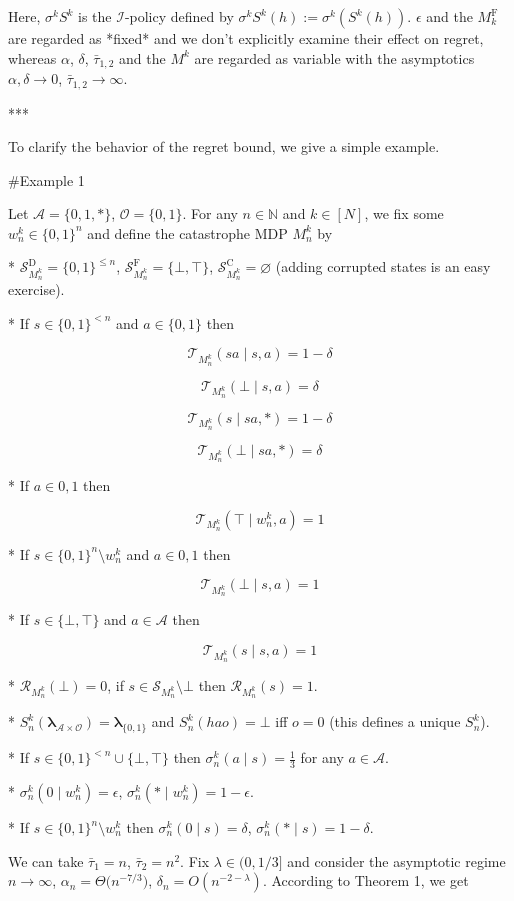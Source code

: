 \documentclass[a4paper]{article}
\newcommand{\Bool}{\{0,1\}}
\newcommand{\AP}[1]{\left(#1\right)}
\newcommand{\Nats}{\mathbb{N}}
\newcommand{\Estr}{\boldsymbol{\lambda}}
\newcommand{\Ob}{\mathcal{O}}
\newcommand{\A}{\mathcal{A}}
\newcommand{\St}{\mathcal{S}}
\newcommand{\T}{\mathcal{T}}
\newcommand{\R}{\mathcal{R}}
\newcommand{\In}{\mathcal{I}}
\newcommand{\RMC}{\mathrm{C}}
\newcommand{\RMD}{\mathrm{D}}
\newcommand{\RMF}{\mathrm{F}}
\newcommand{\SF}{\St^{\RMF}}
\newcommand{\SD}{\St^{\RMD}}
\newcommand{\SC}{\St^{\RMC}}
\newcommand{\MF}{M^{\RMF}}
\begin{document}
Here, $\sigma^k S^k$ is the $\In$-policy defined by $\sigma^k S^k(h):=\sigma^k\AP{S^k(h)}$. $\epsilon$ and the $\MF_k$ are regarded as *fixed* and we don't explicitly examine their effect on regret, whereas $\alpha$, $\delta$, $\bar{\tau}_{1,2}$ and the $M^k$ are regarded as variable with the asymptotics $\alpha,\delta \rightarrow 0$, $\bar{\tau}_{1,2} \rightarrow \infty$.

***

To clarify the behavior of the regret bound, we give a simple example.

\#Example 1

Let $\A = \{0,1,*\}$, $\Ob=\Bool$. For any $n \in \Nats$ and $k \in [N]$, we fix some $w_n^k \in \Bool^n$ and define the catastrophe MDP $M_n^k$ by

* $\SD_{M_n^k} = \Bool^{\leq n}$, $\SF_{M_n^k} = \{\bot,\top\}$, $\SC_{M_n^k} = \varnothing$ (adding corrupted states is an easy exercise).

* If $s \in \Bool^{< n}$ and $a \in \Bool$ then 

$$\T_{M_n^k}(sa \mid s,a) = 1 - \delta$$

$$\T_{M_n^k}(\bot \mid s,a) = \delta$$

$$\T_{M_n^k}(s \mid sa,*) = 1 - \delta$$

$$\T_{M_n^k}(\bot \mid sa,*) = \delta$$

* If $a \in {0,1}$ then

$$\T_{M_n^k}(\top \mid w_n^k,a) = 1$$

* If $s \in \Bool^n \setminus w_n^k$ and $a \in {0,1}$ then

$$\T_{M_n^k}(\bot \mid s,a) = 1$$

* If $s \in \{\bot,\top\}$ and $a \in \A$ then

$$\T_{M_n^k}(s \mid s,a) = 1$$

* $\R_{M_n^k}(\bot)=0$, if $s \in \St_{M_n^k} \setminus \bot$ then $\R_{M_n^k}(s)=1$.

* $S_n^k(\Estr_{\A \times \Ob})=\Estr_{\Bool}$ and $S_n^k(hao)=\bot$ iff $o = 0$ (this defines a unique $S_n^k$).

* If $s \in \Bool^{<n} \cup \{\bot,\top\}$ then $\sigma_n^k(a \mid s) = \frac{1}{3}$ for any $a \in \A$.

* $\sigma_n^k(0 \mid w_n^k) = \epsilon$, $\sigma_n^k(* \mid w_n^k) = 1 - \epsilon$.

* If $s \in \Bool^n \setminus w_n^k$ then $\sigma_n^k(0 \mid s) = \delta$, $\sigma_n^k(* \mid s) = 1 - \delta$.

We can take $\bar{\tau}_1 = n$, $\bar{\tau}_2 = n^2$. Fix $\lambda \in (0,1/3]$ and consider the asymptotic regime $n \rightarrow \infty$, $\alpha_n = \Theta\Big(n^{-7/3}\Big)$, $\delta_n = O\AP{n^{-2-\lambda}}$. According to Theorem 1, we get
\end{document}
